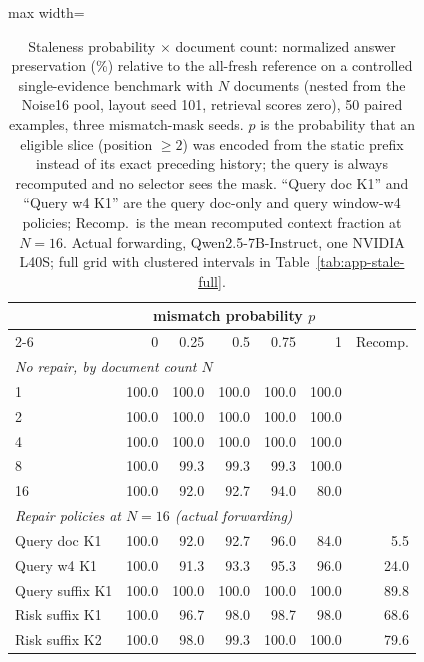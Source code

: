 \begin{table}[t]
\centering
\footnotesize
\setlength{\tabcolsep}{3pt}
\begin{adjustbox}{max width=\linewidth}
\begin{tabular}{lrrrrrr}
\toprule
 & \multicolumn{5}{c}{mismatch probability $p$} & \\
\cmidrule(lr){2-6}
 & 0 & 0.25 & 0.5 & 0.75 & 1 & Recomp. \\
\midrule
\multicolumn{7}{l}{\emph{No repair, by document count $N$}} \\
1 & 100.0 & 100.0 & 100.0 & 100.0 & 100.0 \\
2 & 100.0 & 100.0 & 100.0 & 100.0 & 100.0 \\
4 & 100.0 & 100.0 & 100.0 & 100.0 & 100.0 \\
8 & 100.0 & 99.3 & 99.3 & 99.3 & 100.0 \\
16 & 100.0 & 92.0 & 92.7 & 94.0 & 80.0 \\
\midrule
\multicolumn{7}{l}{\emph{Repair policies at $N=16$ (actual forwarding)}} \\
Query doc K1 & 100.0 & 92.0 & 92.7 & 96.0 & 84.0 & 5.5 \\
Query w4 K1 & 100.0 & 91.3 & 93.3 & 95.3 & 96.0 & 24.0 \\
Query suffix K1 & 100.0 & 100.0 & 100.0 & 100.0 & 100.0 & 89.8 \\
Risk suffix K1 & 100.0 & 96.7 & 98.0 & 98.7 & 98.0 & 68.6 \\
Risk suffix K2 & 100.0 & 98.0 & 99.3 & 100.0 & 100.0 & 79.6 \\
\bottomrule
\end{tabular}
\end{adjustbox}
\caption{Staleness probability $\times$ document count: normalized answer preservation (\%) relative to the all-fresh reference on a controlled single-evidence benchmark with $N$ documents (nested from the Noise16 pool, layout seed 101, retrieval scores zero), 50 paired examples, three mismatch-mask seeds. $p$ is the probability that an eligible slice (position $\geq 2$) was encoded from the static prefix instead of its exact preceding history; the query is always recomputed and no selector sees the mask. ``Query doc K1'' and ``Query w4 K1'' are the query doc-only and query window-w4 policies; Recomp.\ is the mean recomputed context fraction at $N{=}16$. Actual forwarding, Qwen2.5-7B-Instruct, one NVIDIA L40S; full grid with clustered intervals in Table~\ref{tab:app-stale-full}.}
\label{tab:staleness}
\end{table}
